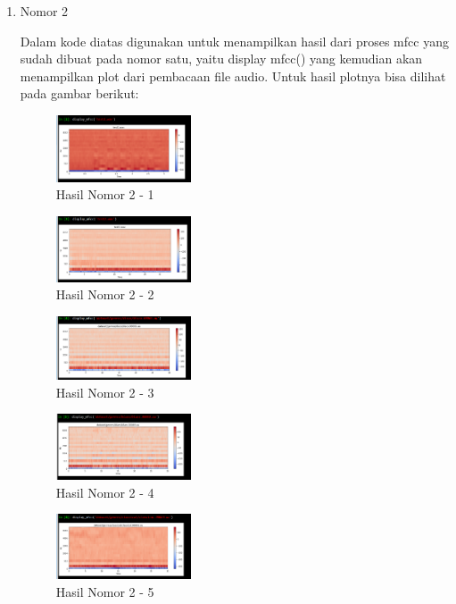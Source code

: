 \begin{enumerate}
\item Nomor 2
\hfill\break
	
Dalam kode diatas digunakan untuk menampilkan hasil dari proses mfcc yang sudah dibuat pada nomor satu, yaitu display mfcc() yang kemudian akan menampilkan plot dari pembacaan file audio. Untuk hasil plotnya bisa dilihat pada gambar berikut:
\hfill\break
	\begin{figure}[H]
		\includegraphics[width=4cm]{figures/1174054/6/11.png}
		\centering
		\caption{Hasil Nomor 2 - 1}
	\end{figure}
	\begin{figure}[H]
		\includegraphics[width=4cm]{figures/1174054/6/12.png}
		\centering
		\caption{Hasil Nomor 2 - 2}
	\end{figure}
	\begin{figure}[H]
		\includegraphics[width=4cm]{figures/1174054/6/13.png}
		\centering
		\caption{Hasil Nomor 2 - 3}
	\end{figure}
	\begin{figure}[H]
		\includegraphics[width=4cm]{figures/1174054/6/14.png}
		\centering
		\caption{Hasil Nomor 2 - 4}
	\end{figure}
	\begin{figure}[H]
		\includegraphics[width=4cm]{figures/1174054/6/15.png}
		\centering
		\caption{Hasil Nomor 2 - 5}

\end{figure}
\end{enumerate}
